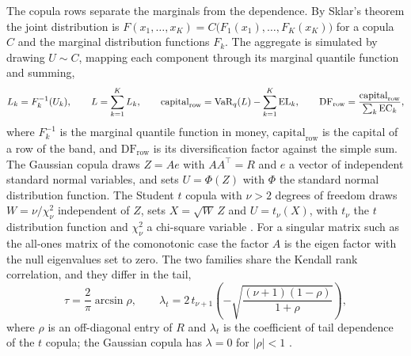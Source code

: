 The copula rows separate the marginals from the dependence. By Sklar's theorem the joint distribution is
$F(x_1,\dots,x_K)=C\bigl(F_1(x_1),\dots,F_K(x_K)\bigr)$ for a copula $C$ and the marginal distribution functions $F_k$. The
aggregate is simulated by drawing $U\sim C$, mapping each component through its marginal quantile function and summing,
\begin{equation}
L_k=F_k^{-1}(U_k),\qquad L=\sum_{k=1}^{K}L_k,\qquad
\mathrm{capital}_{\mathrm{row}}=\operatorname{VaR}_q(L)-\sum_{k=1}^{K}\mathrm{EL}_k,\qquad
\mathrm{DF}_{\mathrm{row}}=\frac{\mathrm{capital}_{\mathrm{row}}}{\sum_{k}\mathrm{EC}_k},
\label{eq:ag-copula}
\end{equation}
where $F_k^{-1}$ is the marginal quantile function in money, $\mathrm{capital}_{\mathrm{row}}$ is the capital of a row of the
band, and $\mathrm{DF}_{\mathrm{row}}$ is its diversification factor against the simple sum. The Gaussian copula draws
$Z=Ae$ with $AA^{\top}=R$ and $e$ a vector of independent standard normal variables, and sets $U=\Phi(Z)$ with $\Phi$ the
standard normal distribution function. The Student $t$ copula with $\nu>2$ degrees of freedom draws $W=\nu/\chi^2_{\nu}$
independent of $Z$, sets $X=\sqrt{W}\,Z$ and $U=t_{\nu}(X)$, with $t_{\nu}$ the $t$ distribution function and $\chi^2_{\nu}$ a
chi-square variable \citep{credit-capital:li2000,credit-capital:freymcneil2003,credit-capital:demartamcneil2005}. For a singular
matrix such as the all-ones matrix of the comonotonic case the factor $A$ is the eigen factor with the null eigenvalues set to
zero. The two families share the Kendall rank correlation, and they differ in the tail,
\begin{equation}
\tau=\frac{2}{\pi}\arcsin\rho,\qquad
\lambda_{t}=2\,t_{\nu+1}\!\left(-\sqrt{\frac{(\nu+1)(1-\rho)}{1+\rho}}\right),
\label{eq:ag-tail}
\end{equation}
where $\rho$ is an off-diagonal entry of $R$ and $\lambda_t$ is the coefficient of tail dependence of the $t$ copula; the
Gaussian copula has $\lambda=0$ for $\lvert\rho\rvert<1$ \citep{credit-capital:demartamcneil2005}.

